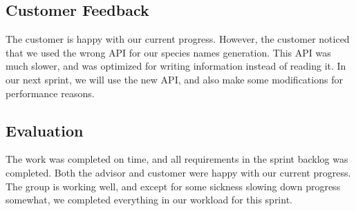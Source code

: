 \subsection{Customer Feedback}
The customer is happy with our current progress. However, the customer noticed that we used the wrong API for our species names generation. This API was much slower, and was optimized for writing information instead of reading it. In our next sprint, we will use the new API, and also make some modifications for performance reasons. 

\subsection{Evaluation}
The work was completed on time, and all requirements in the sprint backlog was completed. Both the advisor and customer were happy with our current progress. The group is working well, and except for some sickness slowing down progress somewhat, we completed everything in our workload for this sprint.
